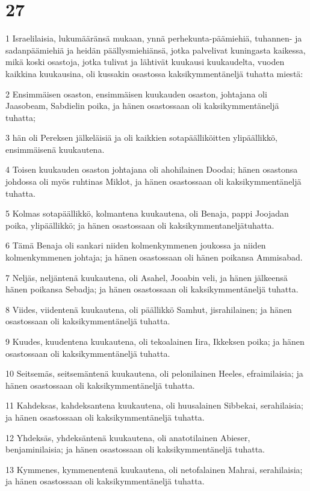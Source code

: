 \chapter{27}

\par 1 Israelilaisia, lukumääränsä mukaan, ynnä perhekunta-päämiehiä, tuhannen- ja sadanpäämiehiä ja heidän päällysmiehiänsä, jotka palvelivat kuningasta kaikessa, mikä koski osastoja, jotka tulivat ja lähtivät kuukausi kuukaudelta, vuoden kaikkina kuukausina, oli kussakin osastossa kaksikymmentäneljä tuhatta miestä:
\par 2 Ensimmäisen osaston, ensimmäisen kuukauden osaston, johtajana oli Jaasobeam, Sabdielin poika, ja hänen osastossaan oli kaksikymmentäneljä tuhatta;
\par 3 hän oli Pereksen jälkeläisiä ja oli kaikkien sotapäälliköitten ylipäällikkö, ensimmäisenä kuukautena.
\par 4 Toisen kuukauden osaston johtajana oli ahohilainen Doodai; hänen osastonsa johdossa oli myös ruhtinas Miklot, ja hänen osastossaan oli kaksikymmentäneljä tuhatta.
\par 5 Kolmas sotapäällikkö, kolmantena kuukautena, oli Benaja, pappi Joojadan poika, ylipäällikkö; ja hänen osastossaan oli kaksikymmentaneljätuhatta.
\par 6 Tämä Benaja oli sankari niiden kolmenkymmenen joukossa ja niiden kolmenkymmenen johtaja; ja hänen osastossaan oli hänen poikansa Ammisabad.
\par 7 Neljäs, neljäntenä kuukautena, oli Asahel, Jooabin veli, ja hänen jälkeensä hänen poikansa Sebadja; ja hänen osastossaan oli kaksikymmentäneljä tuhatta.
\par 8 Viides, viidentenä kuukautena, oli päällikkö Samhut, jisrahilainen; ja hänen osastossaan oli kaksikymmentäneljä tuhatta.
\par 9 Kuudes, kuudentena kuukautena, oli tekoalainen Iira, Ikkeksen poika; ja hänen osastossaan oli kaksikymmentäneljä tuhatta.
\par 10 Seitsemäs, seitsemäntenä kuukautena, oli pelonilainen Heeles, efraimilaisia; ja hänen osastossaan oli kaksikymmentäneljä tuhatta.
\par 11 Kahdeksas, kahdeksantena kuukautena, oli huusalainen Sibbekai, serahilaisia; ja hänen osastossaan oli kaksikymmentäneljä tuhatta.
\par 12 Yhdeksäs, yhdeksäntenä kuukautena, oli anatotilainen Abieser, benjaminilaisia; ja hänen osastossaan oli kaksikymmentäneljä tuhatta.
\par 13 Kymmenes, kymmenentenä kuukautena, oli netofalainen Mahrai, serahilaisia; ja hänen osastossaan oli kaksikymmentäneljä tuhatta.
